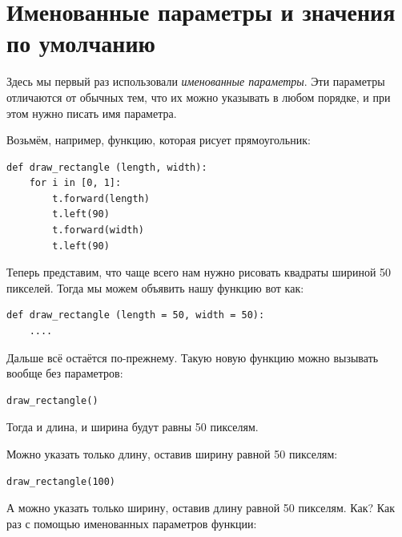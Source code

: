 \section*{Именованные параметры и значения по умолчанию}

Здесь мы первый раз использовали \emph{именованные параметры}. Эти параметры отличаются от обычных тем, что их можно указывать в любом порядке, и при этом нужно писать имя параметра.

Возьмём, например, функцию, которая рисует прямоугольник:

\begin{listing}
\begin{verbatim}
def draw_rectangle (length, width):
    for i in [0, 1]:
        t.forward(length)
        t.left(90)
        t.forward(width)
        t.left(90)
\end{verbatim}
\end{listing}

Теперь представим, что чаще всего нам нужно рисовать квадраты шириной 50 пикселей. Тогда мы можем объявить нашу функцию вот как:

\begin{listing}
\begin{verbatim}
def draw_rectangle (length = 50, width = 50):
	....
\end{verbatim}
\end{listing}

Дальше всё остаётся по-прежнему. Такую новую функцию можно вызывать вообще без параметров:

\begin{listing}
\begin{verbatim}
draw_rectangle()
\end{verbatim}
\end{listing}

Тогда и длина, и ширина будут равны 50 пикселям.

Можно указать только длину, оставив ширину равной 50 пикселям:

\begin{listing}
\begin{verbatim}
draw_rectangle(100)
\end{verbatim}
\end{listing}

А можно указать только ширину, оставив длину равной 50 пикселям. Как? Как раз с помощью именованных параметров функции:

